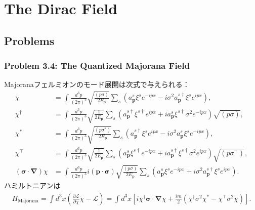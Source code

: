 \chapter{The Dirac Field}
\section*{Problems}
\subsection{Problem 3.4: The Quantized Majorana Field}
Majoranaフェルミオンのモード展開は次式で与えられる：
\begin{align*}
    \chi & = \int \frac{d^3p}{(2\pi)^3} \sqrt{\frac{(p \sigma)}{2E_{\boldsymbol{p}}}} \sum_s \left( a_{\boldsymbol{p}}^s \xi^s e^{-ipx} - i \sigma^2 a_{\boldsymbol{p}}^{s\dagger} \xi^s e^{ipx} \right) , \\
    \chi^\dagger & = \int \frac{d^3p}{(2\pi)^3} \sqrt{\frac{1}{2E_{\boldsymbol{p}}}} \sum_s \left( a_{\boldsymbol{p}}^{s\dagger} \xi^{s\dagger} e^{ipx} + i a_{\boldsymbol{p}}^{s} \xi^{s\dagger} \sigma^2 e^{-ipx} \right) \sqrt{(p \sigma)} , \\
    \chi^\ast & = \int \frac{d^3p}{(2\pi)^3} \sqrt{\frac{(p\sigma^\ast)}{2E_{\boldsymbol{p}}}} \sum_s \left( a_{\boldsymbol{p}}^{s\dagger} \xi^s e^{ipx} - i \sigma^2 a_{\boldsymbol{p}}^{s} \xi^s e^{-ipx} \right) , \\
    \chi^\top & = \int \frac{d^3p}{(2\pi)^3} \sqrt{\frac{1}{2E_{\boldsymbol{p}}}} \sum_s \left( a_{\boldsymbol{p}}^{s} \xi^{s\dagger} e^{-ipx} + i a_{\boldsymbol{p}}^{s\dagger} \xi^{s\dagger} \sigma^2 e^{ipx} \right) \sqrt{(p\sigma^\top)} , \\
    (\boldsymbol{\sigma} \cdot \boldsymbol{\nabla})\chi & = \int \frac{d^3p}{(2\pi)^3} i (\boldsymbol{p} \cdot \boldsymbol{\sigma}) \sqrt{\frac{(p \sigma)}{2E_{\boldsymbol{p}}}} \sum_s \left( a_{\boldsymbol{p}}^s \xi^s e^{-ipx} + i \sigma^2 a_{\boldsymbol{p}}^{s\dagger} \xi^s e^{ipx} \right) .
\end{align*}
ハミルトニアンは
\begin{align}
  H_\text{Majorana} = \int d^3x \left( \frac{\partial \mathcal{L}}{\partial \dot{\chi}} \dot{\chi} - \mathcal{L} \right) = \int d^3x \left[ i \chi^\dagger \boldsymbol{\sigma} \cdot \boldsymbol{\nabla} \chi + \frac{im}{2} ( \chi^\dagger \sigma^2 \chi^\ast - \chi^\top \sigma^2 \chi ) \right] . \label{prob3_4_H}
\end{align}

